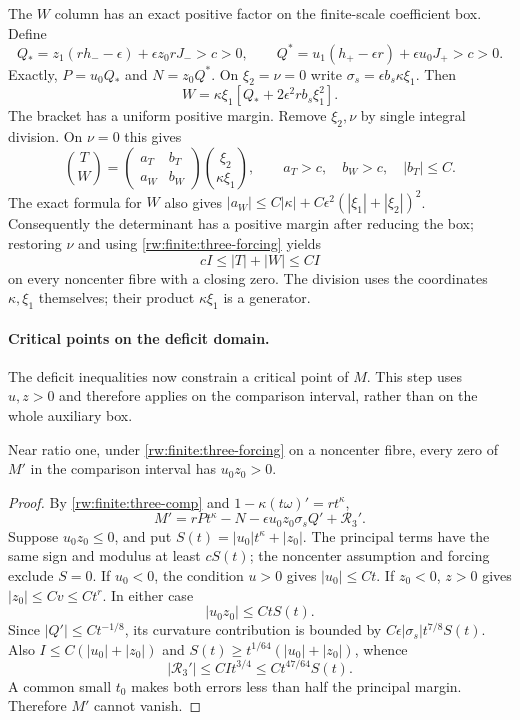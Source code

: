 The $W$ column has an exact positive factor on the finite-scale
coefficient box. Define
\[
 Q_*=z_1(rh_--\epsilon)+\epsilon z_0rJ_->c>0,\qquad
 Q^*=u_1(h_+-\epsilon r)+\epsilon u_0J_+>c>0.
\]
Exactly, $P=u_0Q_*$ and $N=z_0Q^*$. On $\xi_2=\nu=0$ write
$\sigma_s=\epsilon b_s\kappa\xi_1$. Then
\begin{equation}\label{rw:finite:three-W-factor}
 W=\kappa\xi_1[Q_*+2\epsilon^2rb_s\xi_1^2].
\end{equation}
The bracket has a uniform positive margin.
Remove $\xi_2,\nu$ by single integral division. On $\nu=0$ this gives
\[
 \binom TW=
 \begin{pmatrix}a_T&b_T\\a_W&b_W\end{pmatrix}
 \binom{\xi_2}{\kappa\xi_1},
 \qquad a_T>c,\quad b_W>c,\quad |b_T|\le C.
\]
The exact formula for $W$ also gives
$|a_W|\le C|\kappa|+C\epsilon^2(|\xi_1|+|\xi_2|)^2$.
Consequently the determinant has a positive margin after reducing
the box; restoring $\nu$ and using
\eqref{rw:finite:three-forcing} yields
\begin{equation}\label{rw:finite:three-column-norm}
 cI\le |T|+|W|\le CI
\end{equation}
on every noncenter fibre with a closing zero. The division uses the
coordinates $\kappa,\xi_1$ themselves; their product
$\kappa\xi_1$ is a generator.

\paragraph{Critical points on the deficit domain.}
The deficit inequalities now constrain a critical point of $M$.
This step uses $u,z>0$ and therefore applies on the comparison
interval, rather than on the whole auxiliary box.

\begin{lemma}\label{rw:finite:three-critical-gaps}
Near ratio one, under \eqref{rw:finite:three-forcing} on a noncenter
fibre, every zero of $M'$ in the comparison interval has $u_0z_0>0$.
\end{lemma}

\begin{proof}
By \eqref{rw:finite:three-comp} and
$1-\kappa(t\omega)'=rt^\kappa$,
\[
 M'=rP t^\kappa-N-\epsilon u_0z_0\sigma_sQ'
                                 +\mathcal R_3'.
\]
Suppose $u_0z_0\le0$, and put
$S(t)=|u_0|t^\kappa+|z_0|$. The principal terms have the same
sign and modulus at least $cS(t)$; the noncenter assumption and
forcing exclude $S=0$.
If $u_0<0$, the condition $u>0$ gives $|u_0|\le Ct$.
If $z_0<0$, $z>0$ gives $|z_0|\le Cv\le Ct^r$.
In either case
\[
 |u_0z_0|\le CtS(t).
\]
Since $|Q'|\le Ct^{-1/8}$, its curvature contribution is bounded
by $C\epsilon|\sigma_s|t^{7/8}S(t)$.
Also $I\le C(|u_0|+|z_0|)$ and
$S(t)\ge t^{1/64}(|u_0|+|z_0|)$, whence
\[
 |\mathcal R_3'|\le CIt^{3/4}
                      \le Ct^{47/64}S(t).
\]
A common small $t_0$ makes both errors less than half the principal
margin. Therefore $M'$ cannot vanish.
\end{proof}

